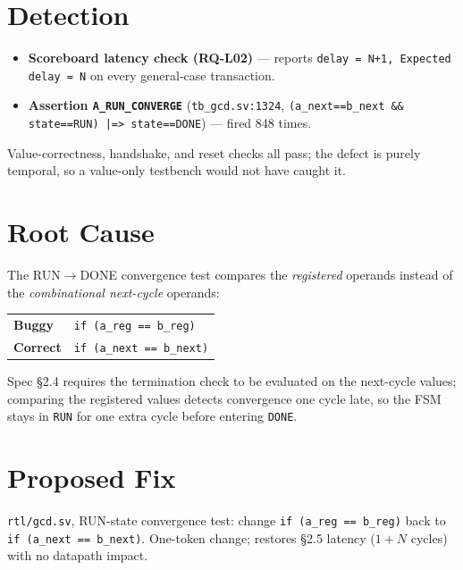 \documentclass[11pt,a4paper]{article}
\begin{document}
\section*{Detection}
\begin{itemize}\itemsep2pt
  \item \textbf{Scoreboard latency check (RQ-L02)} --- reports
        \texttt{delay = N+1, Expected delay = N} on every general-case transaction.
  \item \textbf{Assertion \texttt{A\_RUN\_CONVERGE}} (\texttt{tb\_gcd.sv:1324},
        \texttt{(a\_next==b\_next \&\& state==RUN) |=> state==DONE}) --- fired
        848 times.
\end{itemize}
Value-correctness, handshake, and reset checks all pass; the defect is purely
temporal, so a value-only testbench would not have caught it.

\section*{Root Cause}
The RUN$\rightarrow$DONE convergence test compares the \emph{registered} operands
instead of the \emph{combinational next-cycle} operands:

\begin{table}[H]
\centering
\begin{tabular}{ll}
\textbf{Buggy} & \texttt{if (a\_reg == b\_reg)} \\
\textbf{Correct} & \texttt{if (a\_next == b\_next)} \\
\end{tabular}
\end{table}

\noindent Spec \S2.4 requires the termination check to be evaluated on the
next-cycle values; comparing the registered values detects convergence one cycle
late, so the FSM stays in \texttt{RUN} for one extra cycle before entering
\texttt{DONE}.

\section*{Proposed Fix}
\texttt{rtl/gcd.sv}, RUN-state convergence test: change
\texttt{if (a\_reg == b\_reg)} back to \texttt{if (a\_next == b\_next)}. One-token
change; restores \S2.5 latency ($1{+}N$ cycles) with no datapath impact.
\end{document}
